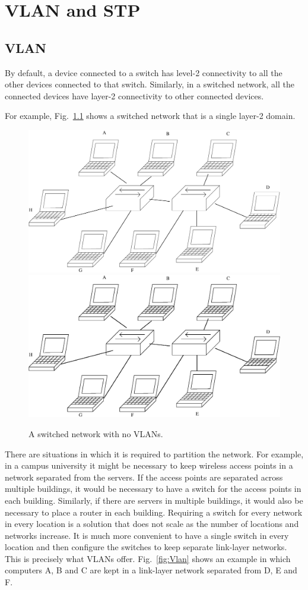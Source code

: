 \chapter{VLAN and STP}

\section{VLAN}
By default, a device connected to a switch has level-2 connectivity to all the other devices connected to that switch.
Similarly, in a switched network, all the connected devices have layer-2 connectivity to other connected devices.

For example, Fig.~\ref{fig:No_vlan} shows a switched network that is a single layer-2 domain.

\begin{figure}
\centering
\ifpdf
\includegraphics[width=0.5\linewidth]{Figures/No_vlan.pdf}
\else
\includegraphics[width=0.5\linewidth]{Figures/No_vlan.eps}
\fi
\caption{A switched network with no VLANs.}
\label{fig:No_vlan}
\end{figure}

There are situations in which it is required to partition the network.
For example, in a campus university it might be necessary to keep wireless access points in a network separated from the servers.
If the access points are separated across multiple buildings, it would be necessary to have a switch for the access points in each building.
Similarly, if there are servers in multiple buildings, it would also be necessary to place a router in each building.
Requiring a switch for every network in every location is a solution that does not scale as the number of locations and networks increase.
It is much more convenient to have a single switch in every location and then configure the switches to keep separate link-layer networks.
This is precisely what VLANs offer.
Fig.~\ref{fig:Vlan} shows an example in which computers A, B and C are kept in a link-layer network separated from D, E and F.


